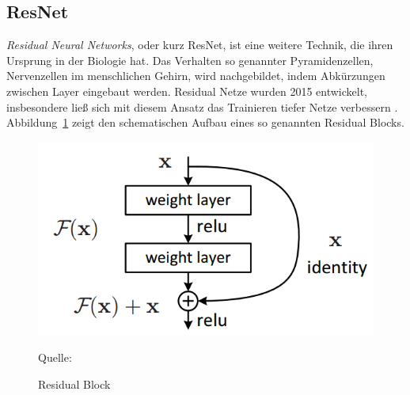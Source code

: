 \subsection{ResNet}
\textit{Residual Neural Networks}, oder kurz ResNet, ist eine weitere Technik, die ihren Ursprung in der Biologie hat. Das Verhalten so genannter Pyramidenzellen, Nervenzellen im menschlichen Gehirn, wird nachgebildet, indem Abkürzungen zwischen Layer eingebaut werden. Residual Netze wurden 2015 entwickelt, insbesondere ließ sich mit diesem Ansatz das Trainieren tiefer Netze verbessern \cite{DBLP:journals/corr/HeZRS15}. Abbildung~\ref{img:ResBlock} zeigt den schematischen Aufbau eines so genannten Residual Blocks. 

\begin{figure}[h]
	\centering
	\includegraphics[scale=0.5]{figures/ResidualBlock.png}
	\caption{Residual Block}
	Quelle: 
	\label{img:ResBlock}
\end{figure}

